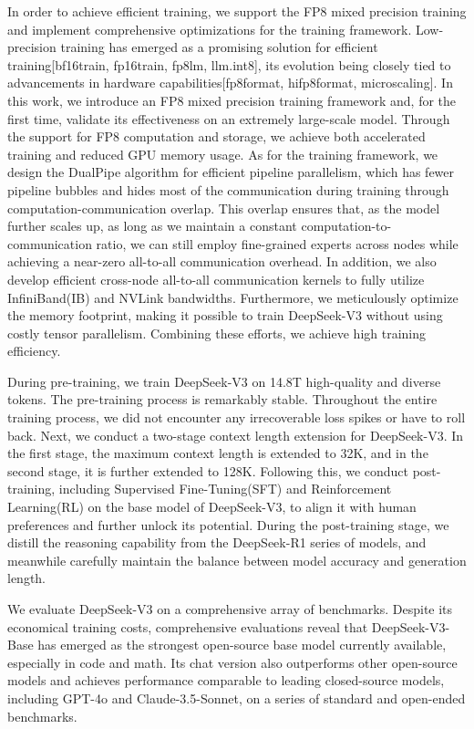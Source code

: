 \documentclass[11pt,a4paper]{article}
\begin{document}
In order to achieve efficient training, we support the FP8 mixed precision training and implement comprehensive optimizations for the training framework. Low-precision training has emerged as a promising solution for efficient training[bf16train, fp16train, fp8lm, llm.int8], its evolution being closely tied to advancements in hardware capabilities[fp8format, hifp8format, microscaling]. In this work, we introduce an FP8 mixed precision training framework and, for the first time, validate its effectiveness on an extremely large-scale model. Through the support for FP8 computation and storage, we achieve both accelerated training and reduced GPU memory usage. As for the training framework, we design the DualPipe algorithm for efficient pipeline parallelism, which has fewer pipeline bubbles and hides most of the communication during training through computation-communication overlap. This overlap ensures that, as the model further scales up, as long as we maintain a constant computation-to-communication ratio, we can still employ fine-grained experts across nodes while achieving a near-zero all-to-all communication overhead. In addition, we also develop efficient cross-node all-to-all communication kernels to fully utilize InfiniBand(IB) and NVLink bandwidths. Furthermore, we meticulously optimize the memory footprint, making it possible to train DeepSeek-V3 without using costly tensor parallelism. Combining these efforts, we achieve high training efficiency.

During pre-training, we train DeepSeek-V3 on 14.8T high-quality and diverse tokens. The pre-training process is remarkably stable. Throughout the entire training process, we did not encounter any irrecoverable loss spikes or have to roll back. Next, we conduct a two-stage context length extension for DeepSeek-V3. In the first stage, the maximum context length is extended to 32K, and in the second stage, it is further extended to 128K. Following this, we conduct post-training, including Supervised Fine-Tuning(SFT) and Reinforcement Learning(RL) on the base model of DeepSeek-V3, to align it with human preferences and further unlock its potential. During the post-training stage, we distill the reasoning capability from the DeepSeek-R1 series of models, and meanwhile carefully maintain the balance between model accuracy and generation length.

We evaluate DeepSeek-V3 on a comprehensive array of benchmarks. Despite its economical training costs, comprehensive evaluations reveal that DeepSeek-V3-Base has emerged as the strongest open-source base model currently available, especially in code and math. Its chat version also outperforms other open-source models and achieves performance comparable to leading closed-source models, including GPT-4o and Claude-3.5-Sonnet, on a series of standard and open-ended benchmarks.
\end{document}
